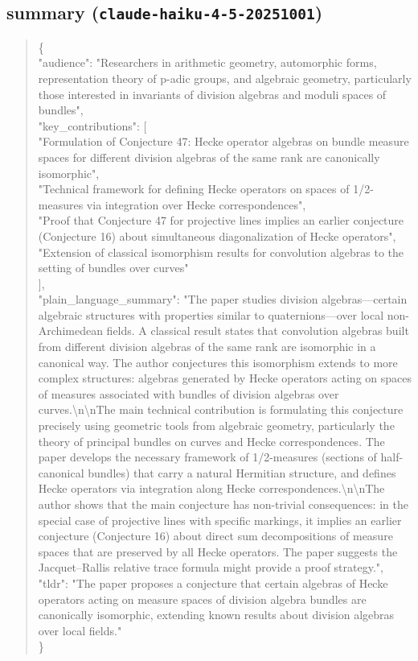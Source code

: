 \documentclass[11pt]{article}
\begin{document}
\subsection*{summary (\texttt{claude-haiku-4-5-20251001})}
\begin{quote}\small\ttfamily\raggedright
\{\\
  "audience": "Researchers in arithmetic geometry, automorphic forms, representation theory of p-adic groups, and algebraic geometry, particularly those interested in invariants of division algebras and moduli spaces of bundles",\\
  "key\_contributions": [\\
    "Formulation of Conjecture 47: Hecke operator algebras on bundle measure spaces for different division algebras of the same rank are canonically isomorphic",\\
    "Technical framework for defining Hecke operators on spaces of 1/2-measures via integration over Hecke correspondences",\\
    "Proof that Conjecture 47 for projective lines implies an earlier conjecture (Conjecture 16) about simultaneous diagonalization of Hecke operators",\\
    "Extension of classical isomorphism results for convolution algebras to the setting of bundles over curves"\\
  ],\\
  "plain\_language\_summary": "The paper studies division algebras---certain algebraic structures with properties similar to quaternions---over local non-Archimedean fields. A classical result states that convolution algebras built from different division algebras of the same rank are isomorphic in a canonical way. The author conjectures this isomorphism extends to more complex structures: algebras generated by Hecke operators acting on spaces of measures associated with bundles of division algebras over curves.\textbackslash{}n\textbackslash{}nThe main technical contribution is formulating this conjecture precisely using geometric tools from algebraic geometry, particularly the theory of principal bundles on curves and Hecke correspondences. The paper develops the necessary framework of 1/2-measures (sections of half-canonical bundles) that carry a natural Hermitian structure, and defines Hecke operators via integration along Hecke correspondences.\textbackslash{}n\textbackslash{}nThe author shows that the main conjecture has non-trivial consequences: in the special case of projective lines with specific markings, it implies an earlier conjecture (Conjecture 16) about direct sum decompositions of measure spaces that are preserved by all Hecke operators. The paper suggests the Jacquet--Rallis relative trace formula might provide a proof strategy.",\\
  "tldr": "The paper proposes a conjecture that certain algebras of Hecke operators acting on measure spaces of division algebra bundles are canonically isomorphic, extending known results about division algebras over local fields."\\
\}\\
\end{quote}
\end{document}
